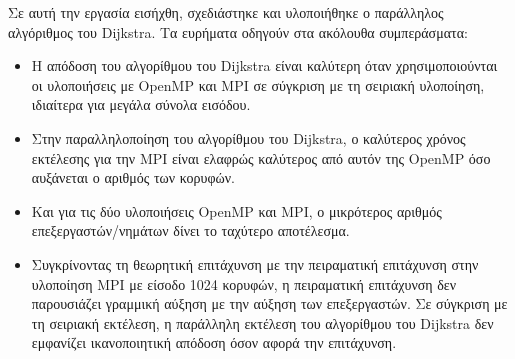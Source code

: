 \documentclass[12pt,a4paper]{article}
\begin{document}
Σε αυτή την εργασία εισήχθη, σχεδιάστηκε και υλοποιήθηκε ο παράλληλος αλγόριθμος του \foreignlanguage{english}{Dijkstra}. Τα ευρήματα οδηγούν στα ακόλουθα συμπεράσματα:
\begin{itemize}
\item Η απόδοση του αλγορίθμου του \foreignlanguage{english}{Dijkstra} είναι καλύτερη όταν χρησιμοποιούνται οι υλοποιήσεις με \foreignlanguage{english}{OpenMP} και \foreignlanguage{english}{MPI} σε σύγκριση με τη σειριακή υλοποίηση, ιδιαίτερα για μεγάλα σύνολα εισόδου.
\item Στην παραλληλοποίηση του αλγορίθμου του \foreignlanguage{english}{Dijkstra}, ο καλύτερος χρόνος εκτέλεσης για την \foreignlanguage{english}{MPI} είναι ελαφρώς καλύτερος από αυτόν της \foreignlanguage{english}{OpenMP} όσο αυξάνεται ο αριθμός των κορυφών.
\item Και για τις δύο υλοποιήσεις \foreignlanguage{english}{OpenMP} και \foreignlanguage{english}{MPI}, ο μικρότερος αριθμός επεξεργαστών/νημάτων δίνει το ταχύτερο αποτέλεσμα.
\item Συγκρίνοντας τη θεωρητική επιτάχυνση με την πειραματική επιτάχυνση στην υλοποίηση \foreignlanguage{english}{MPI} με είσοδο 1024 κορυφών, η πειραματική επιτάχυνση δεν παρουσιάζει γραμμική αύξηση με την αύξηση των επεξεργαστών. Σε σύγκριση με τη σειριακή εκτέλεση, η παράλληλη εκτέλεση του αλγορίθμου του \foreignlanguage{english}{Dijkstra} δεν εμφανίζει ικανοποιητική απόδοση όσον αφορά την επιτάχυνση.
\end{itemize}
\vspace{0.3cm}
\end{document}
